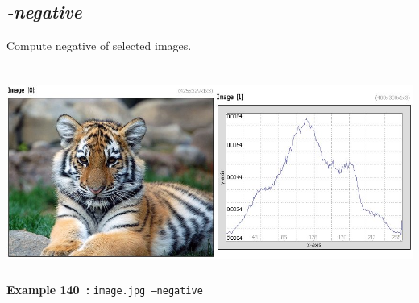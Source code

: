 \documentclass[a4paper,11pt,twoside]{book}
\begin{document}
\subsection{\emph{-negative} }\vspace*{-0.5em}
Compute negative of selected images.
\begin{center}\includegraphics[keepaspectratio=true,height=7cm,width=\textwidth]{img/gmic_def140.jpg}\\
{\footnotesize \textbf{Example 140~:} \texttt{image.jpg --negative}}
\end{center}
\end{document}
